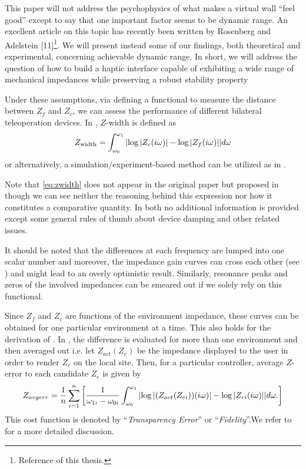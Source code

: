 \begin{displayquote}
This paper will not address the psychophysics of what
makes a virtual wall \enquote{feel good} except to say that one
important factor seems to be dynamic range. An excellent
article on this topic has recently been written by
Rosenberg and Adelstein [11]\footnote{Reference \cite{rosenberg} of this thesis.}. 
We will present instead
some of our findings, both theoretical and experimental,
concerning achievable dynamic range. In short, we will
address the question of how to build a haptic interface
capable of exhibiting a wide range of mechanical
impedances while preserving a robust stability property
\end{displayquote}


Under these assumptions, via defining a functional to measure the distance between $Z_f$ and $Z_c$, we can assess the performance
of different bilateral teleoperation devices. In \cite{goranthesis}, $Z$-width is defined as 
\begin{equation}
Z_{\text{width}} = \int_{\omega_0}^{\omega_1}{\displaystyle \left|\log|Z_{\vphantom{f}c}(i\omega)|-\log |Z_f(i\omega)|\right|}d\omega
\label{eq:zwidth}
\end{equation}
or alternatively, a simulation/experiment-based method can be utilized as in \cite{weir}. 


Note that \eqref{eq:zwidth} does not appear in the original paper \cite{colgate4} but proposed in \cite{goranthesis,passenberg} 
though we can see neither the reasoning behind this expression nor how it constitutes a comparative quantity. In both 
\cite{colgate4,goranthesis} no additional information is provided except some general rules of thumb about device 
damping and other related issues. 

It should be noted that the differences at each frequency are lumped into one scalar number and moreover, the impedance 
gain curves can cross each other (see \cite{goranthesis}) and might lead to an overly optimistic result. Similarly, 
resonance peaks and zeros of the involved impedances can be smeared out if we solely rely on this functional. 

Since $Z_f$ and $Z_c$ are functions of the environment impedance, these curves can be obtained for one particular environment
at a time. This also holds for the derivation of \cite{lawrence}. In \cite{goranthesis}, the difference  is evaluated for more 
than one environment and then averaged out i.e. let $Z_{act}(Z_e)$ be the impedance displayed to the user in order to render 
$Z_e$ on the local site. Then, for a particular controller, average $Z$-error to each candidate $Z_e$ is given by
\begin{equation}
Z_{avgerr} = \frac{1}{n}\sum_{i=1}^n{\left[
    \frac{1}{\omega_{1i}-\omega_{0i}}\int_{\omega_0}^{\omega_1}{%
                                     \abs{\log|(Z_{act}(Z_{ei}))(\iw)|-\log |Z_{ei}(\iw)|}}d\omega.
                                     \right]}
\label{eq:zdiff}
\end{equation}
This cost function is denoted by \enquote{\emph{Transparency Error}} or \enquote{\emph{Fidelity}}.We refer to \cite{weir} 
for a more detailed discussion. 


